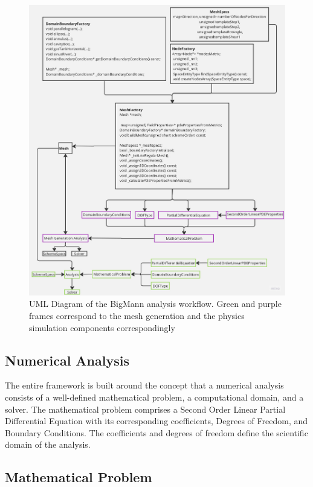 \documentclass{article}
\begin{document}
	\begin{figure}[H]

		\includegraphics[height=1.0\textheight, width=1.05\textwidth, keepaspectratio]{./images/uml.jpg}
		\caption{UML Diagram of the BigMann analysis workflow. Green and purple frames correspond to the mesh generation and the physics simulation components correspondingly}
		\label{fig:UML}
	\end{figure}
	
	\newpage
	
	\subsection {Numerical Analysis}
	
	The entire framework is built around the concept that a numerical analysis consists of a well-defined mathematical problem, a computational domain, and a solver. The mathematical problem comprises a Second Order Linear Partial Differential Equation with its corresponding coefficients, Degrees of Freedom, and Boundary Conditions. The coefficients and degrees of freedom define the scientific domain of the analysis.

	\subsection{Mathematical Problem}
	
\end{document}

